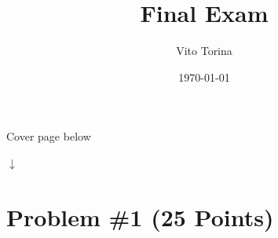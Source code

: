 \documentclass[12pt,letterpaper]{article}
\title{Final Exam}
\author{Vito Torina}
\date{\today}
\begin{document}
\maketitle
{\centering Cover page below\par } 
{\centering $\downarrow$ \par }
\begin{titlepage}
\end{titlepage}
\newpage
\section*{Problem \#1 (25 Points)}
\hrulefill
\end{document}
